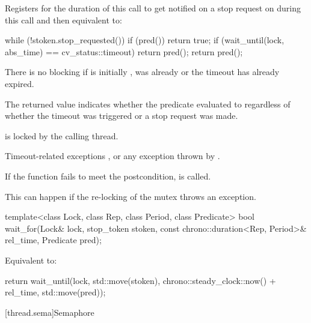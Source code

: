 \begin{itemdescr}
\pnum
\effects
Registers for the duration of this call 
to get notified on a stop request on 
during this call and then equivalent to:
\begin{codeblock}
while (!stoken.stop_requested()) {
  if (pred())
    return true;
  if (wait_until(lock, abs_time) == cv_status::timeout)
    return pred();
}
return pred();
\end{codeblock}

\pnum
\begin{note}
There is no blocking if  is initially ,
 was already 
or the timeout has already expired.
\end{note}

\pnum
\begin{note}
The returned value indicates whether the predicate evaluated to 
regardless of whether the timeout was triggered or a stop request was made.
\end{note}

\pnum
\ensures
{} is locked by the calling thread.

\pnum
\throws
Timeout-related exceptions ,
or any exception thrown by .

\pnum
\remarks
If the function fails to meet the postcondition,
 is called.
\begin{note}
This can happen if the re-locking of the mutex throws an exception.
\end{note}
\end{itemdescr}

\begin{itemdecl}
template<class Lock, class Rep, class Period, class Predicate>
  bool wait_for(Lock& lock, stop_token stoken,
                const chrono::duration<Rep, Period>& rel_time, Predicate pred);
\end{itemdecl}

\begin{itemdescr}
\pnum
\effects
Equivalent to:
\begin{codeblock}
return wait_until(lock, std::move(stoken), chrono::steady_clock::now() + rel_time,
                  std::move(pred));
\end{codeblock}
\end{itemdescr}

[thread.sema]{Semaphore}

